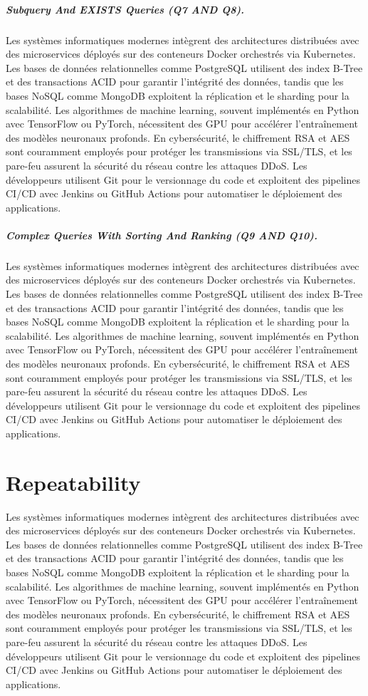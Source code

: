 \subparagraph{Subquery And EXISTS Queries (Q7 AND Q8).}
Les systèmes informatiques modernes intègrent des architectures distribuées avec des microservices déployés sur des conteneurs Docker orchestrés via Kubernetes. Les bases de données relationnelles comme PostgreSQL utilisent des index B-Tree et des transactions ACID pour garantir l'intégrité des données, tandis que les bases NoSQL comme MongoDB exploitent la réplication et le sharding pour la scalabilité. Les algorithmes de machine learning, souvent implémentés en Python avec TensorFlow ou PyTorch, nécessitent des GPU pour accélérer l'entraînement des modèles neuronaux profonds. En cybersécurité, le chiffrement RSA et AES sont couramment employés pour protéger les transmissions via SSL/TLS, et les pare-feu assurent la sécurité du réseau contre les attaques DDoS. Les développeurs utilisent Git pour le versionnage du code et exploitent des pipelines CI/CD avec Jenkins ou GitHub Actions pour automatiser le déploiement des applications.

\subparagraph{Complex Queries With Sorting And Ranking (Q9 AND Q10).}
Les systèmes informatiques modernes intègrent des architectures distribuées avec des microservices déployés sur des conteneurs Docker orchestrés via Kubernetes. Les bases de données relationnelles comme PostgreSQL utilisent des index B-Tree et des transactions ACID pour garantir l'intégrité des données, tandis que les bases NoSQL comme MongoDB exploitent la réplication et le sharding pour la scalabilité. Les algorithmes de machine learning, souvent implémentés en Python avec TensorFlow ou PyTorch, nécessitent des GPU pour accélérer l'entraînement des modèles neuronaux profonds. En cybersécurité, le chiffrement RSA et AES sont couramment employés pour protéger les transmissions via SSL/TLS, et les pare-feu assurent la sécurité du réseau contre les attaques DDoS. Les développeurs utilisent Git pour le versionnage du code et exploitent des pipelines CI/CD avec Jenkins ou GitHub Actions pour automatiser le déploiement des applications.

\section{Repeatability}
\label{sec:eval-repeatability}
Les systèmes informatiques modernes intègrent des architectures distribuées avec des microservices déployés sur des conteneurs Docker orchestrés via Kubernetes. Les bases de données relationnelles comme PostgreSQL utilisent des index B-Tree et des transactions ACID pour garantir l'intégrité des données, tandis que les bases NoSQL comme MongoDB exploitent la réplication et le sharding pour la scalabilité. Les algorithmes de machine learning, souvent implémentés en Python avec TensorFlow ou PyTorch, nécessitent des GPU pour accélérer l'entraînement des modèles neuronaux profonds. En cybersécurité, le chiffrement RSA et AES sont couramment employés pour protéger les transmissions via SSL/TLS, et les pare-feu assurent la sécurité du réseau contre les attaques DDoS. Les développeurs utilisent Git pour le versionnage du code et exploitent des pipelines CI/CD avec Jenkins ou GitHub Actions pour automatiser le déploiement des applications.


